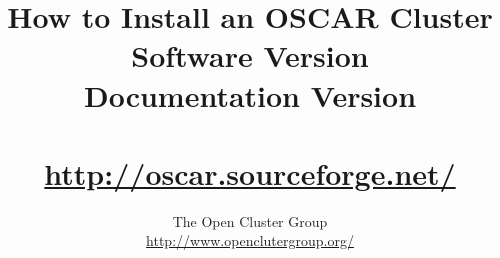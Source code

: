 %
%
%

\title{How to Install an OSCAR Cluster \\
Software Version \oscarversion \\
Documentation Version \docsversion \\
\ \\
\url{http://oscar.sourceforge.net/} \\
}

\author{The Open Cluster Group \\
\url{http://www.openclutergroup.org/}}
\maketitle

